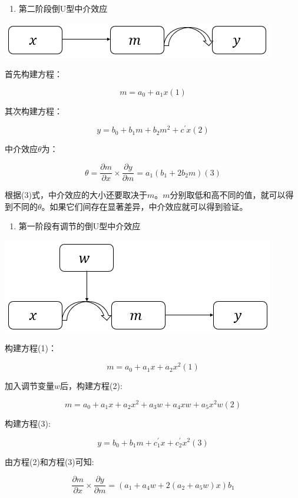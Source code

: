 \documentclass[
]{book}
\providecommand{\tightlist}{%
  \setlength{\itemsep}{0pt}\setlength{\parskip}{0pt}}
\begin{document}
\begin{enumerate}
\def\labelenumi{\arabic{enumi}.}
\setcounter{enumi}{2}
\tightlist
\item
  第二阶段倒U型中介效应
\end{enumerate}

\includegraphics{figs/1223.png}

首先构建方程：

\[
m=a_{0}+a_{1}x(1)
\]

其次构建方程：

\[
y=b_{0}+b_{1}m+b_{2}m^{2}+c^{'}x(2)
\]

中介效应\(\theta\)为：

\[
\theta=\frac{\partial{m}}{\partial{x}}{\times}\frac{\partial{y}}{\partial{m}}=a_{1}(b_{1}+2b_{2}m)(3)
\]

根据(3)式，中介效应的大小还要取决于\(m\)。\(m\)分别取低和高不同的值，就可以得到不同的\(\theta\)。如果它们间存在显著差异，中介效应就可以得到验证。

\begin{enumerate}
\def\labelenumi{\arabic{enumi}.}
\setcounter{enumi}{3}
\tightlist
\item
  第一阶段有调节的倒U型中介效应
\end{enumerate}

\includegraphics{figs/1224.png}

构建方程(1)：

\[
m=a_{0}+a_{1}x+a_{2}x^{2}(1)
\]

加入调节变量\(w\)后，构建方程(2):

\[
m=a_{0}+a_{1}x+a_{2}x^{2}+a_{3}w+a_{4}xw+a_{5}x^{2}w(2)
\]

构建方程(3):

\[
y=b_{0}+b_{1}m+c^{'}_{1}x+c^{'}_{2}x^{2}(3)
\]

由方程(2)和方程(3)可知:

\[
\frac{\partial m}{\partial x}{\times}\frac{\partial y}{\partial m}=(a_{1}+a_{4}w+2(a_{2}+a_{5}w)x)b_{1}
\]
\end{document}
